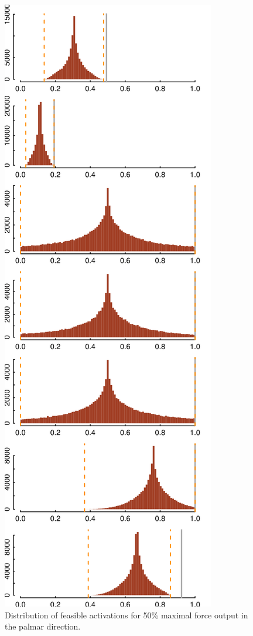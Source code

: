\begin{figure}[htbp]
\centering
\includegraphics{sections/figs/raw_histograms.png}
\caption{Distribution of feasible activations for 50\% maximal force output in the palmar direction.}
\label{fig:raw_histograms}
\end{figure}


